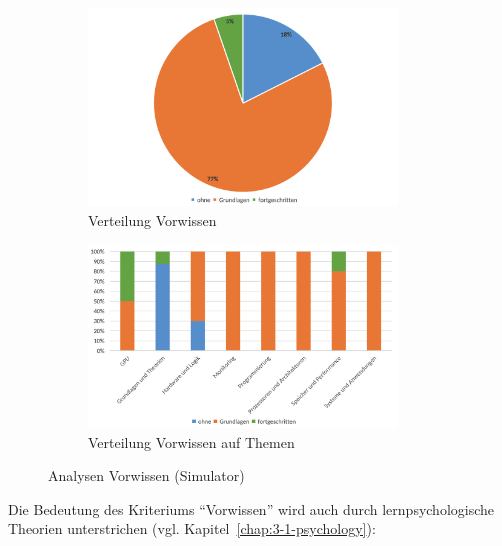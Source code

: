 \begin{figure}[!htbp]
    \centering
    \begin{subfigure}[b]{0.48\textwidth}
        \centering
        \includegraphics[width=0.90\textwidth]{graphics_sim/10-vorwissen.png}
        \caption{Verteilung Vorwissen}
        \label{fig:10-vorwissen}
    \end{subfigure}
    \hfill
    \begin{subfigure}[b]{0.48\textwidth}
        \centering
        \includegraphics[width=0.90\textwidth]{graphics_sim/11-vorwissen-thema.png}
        \caption{Verteilung Vorwissen auf Themen}
        \label{fig:11-vorwissen-thema}
    \end{subfigure}
    \caption{Analysen Vorwissen (Simulator)}
    \label{fig:vorwissen-gesamt}
\end{figure}

Die Bedeutung des Kriteriums \enquote{Vorwissen} wird auch durch lernpsychologische Theorien unterstrichen (vgl. Kapitel~\ref{chap:3-1-psychology}):

